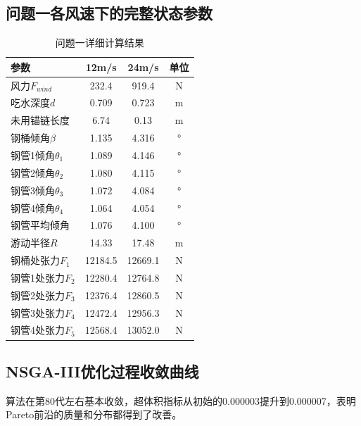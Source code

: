 \documentclass[withoutpreface,bwprint]{cumcmthesis}
\begin{document}
\begin{appendices}
\subsection{问题一各风速下的完整状态参数}
\begin{table}[H]
\centering
\footnotesize
\begin{tabular}{lccc}
\toprule
参数 & 12m/s & 24m/s & 单位 \\
\midrule
风力$F_{wind}$ & 232.4 & 919.4 & N \\
吃水深度$d$ & 0.709 & 0.723 & m \\
未用锚链长度 & 6.74 & 0.13 & m \\
钢桶倾角$\beta$ & 1.135 & 4.316 & ° \\
钢管1倾角$\theta_1$ & 1.089 & 4.146 & ° \\
钢管2倾角$\theta_2$ & 1.080 & 4.115 & ° \\
钢管3倾角$\theta_3$ & 1.072 & 4.084 & ° \\
钢管4倾角$\theta_4$ & 1.064 & 4.054 & ° \\
钢管平均倾角 & 1.076 & 4.100 & ° \\
游动半径$R$ & 14.33 & 17.48 & m \\
钢桶处张力$F_1$ & 12184.5 & 12669.1 & N \\
钢管1处张力$F_2$ & 12280.4 & 12764.8 & N \\
钢管2处张力$F_3$ & 12376.4 & 12860.5 & N \\
钢管3处张力$F_4$ & 12472.4 & 12956.3 & N \\
钢管4处张力$F_5$ & 12568.4 & 13052.0 & N \\
\bottomrule
\end{tabular}
\caption{问题一详细计算结果}
\end{table}

\subsection{NSGA-III优化过程收敛曲线}
算法在第80代左右基本收敛，超体积指标从初始的0.000003提升到0.000007，表明Pareto前沿的质量和分布都得到了改善。

\end{appendices}
\end{document}
